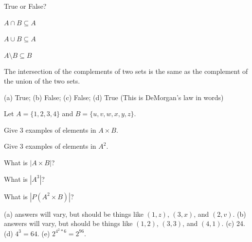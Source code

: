 \begin{requ}
True or False?
\begin{lenum}
\item
$A\cap B\subseteq A$
\item
$A\cup B \subseteq A$
\item
$A\setminus B \subseteq B$
\item
The intersection of the complements of two sets
is the same as the complement of the union of the two sets.
\end{lenum}
\begin{requanswer}
(a) True; 
(b) False; 
(c) False; 
(d) True (This is DeMorgan's law in words)
\end{requanswer}
\end{requ}

\begin{requ}
Let $A=\{1,2,3,4\}$ and $B=\{u,v,w,x,y,z\}$.
\begin{lenum}
\item
Give 3 examples of elements in $A\times B$.
\item
Give 3 examples of elements in $A^2$.
\item
What is $|A\times B|$?
\item
What is $|A^3|$?
\item
What is $|P(A^2\times B)|$?
\end{lenum}
\begin{requanswer}
(a) answers will vary, but should be things like $(1,z)$, $(3,x)$, and $(2,v)$.
(b) answers will vary, but should be things like $(1,2)$, $(3,3)$, and $(4,1)$.
(c) 24.
(d) $4^3=64$.
(e) $2^{4^2*6}=2^{96}$.
\end{requanswer}
\end{requ}

